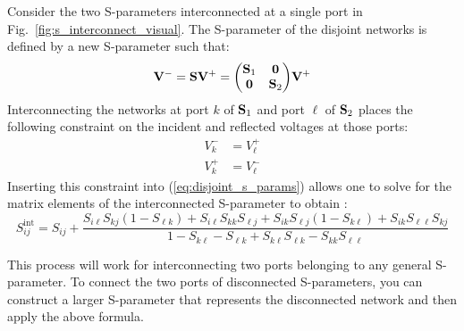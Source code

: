 Consider the two S-parameters interconnected at a single port in Fig.\ \ref{fig:s_interconnect_visual}. The S-parameter of the disjoint networks is defined by a new S-parameter such that:
\begin{equation}\label{eq:disjoint_s_params}
    \vb{V}^- = \vb{S} \vb{V}^+ = \mqty(\vb{S}_1 & \vb{0} \\ \vb{0} & \vb{S}_2) \vb{V}^+
\end{equation}
Interconnecting the networks at port $k$ of $\vb{S}_1$ and port $\ell$ of $\vb{S}_2$ places the following constraint on the incident and reflected voltages at those ports:
\begin{align*}
    V_k^- &= V_\ell^+ \\
    V_k^+ &= V_\ell^-
\end{align*}
Inserting this constraint into (\ref{eq:disjoint_s_params}) allows one to solve for the matrix elements of the interconnected S-parameter to obtain \cite{filipsson_new_1981}:
\begin{equation}
    S^{\text{int}}_{ij} = S_{ij} + \frac{S_{i\ell}S_{kj}(1-S_{\ell k}) + S_{i\ell}S_{kk}S_{\ell j} + S_{ik}S_{\ell j}(1 - S_{k \ell}) + S_{ik}S_{\ell \ell}S_{kj}}{1 - S_{k\ell} - S_{\ell k} + S_{k\ell}S_{\ell k} - S_{kk}S_{\ell\ell}}
\end{equation} 

This process will work for interconnecting two ports belonging to any general S-parameter. To connect the two ports of disconnected S-parameters, you can construct a larger S-parameter that represents the disconnected network and then apply the above formula.

